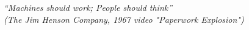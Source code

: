 \begin{epigrafe}
\vspace*{\fill}
\begin{flushright}
\emph{``Machines should work; People should think'' \\ (The Jim Henson Company, 1967 video "Paperwork Explosion")}
\end{flushright}
\end{epigrafe}